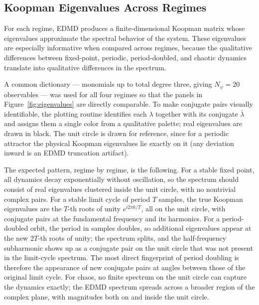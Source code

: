 \documentclass[11pt]{article}
\begin{document}
\subsection{Koopman Eigenvalues Across Regimes}
For each regime, EDMD produces a finite-dimensional Koopman matrix whose eigenvalues approximate the spectral behavior of the system. These eigenvalues are especially informative when compared across regimes, because the qualitative differences between fixed-point, periodic, period-doubled, and chaotic dynamics translate into qualitative differences in the spectrum.

A common dictionary --- monomials up to total degree three, giving $N_\psi = 20$ observables --- was used for all four regimes so that the panels in Figure~\ref{fig:eigenvalues} are directly comparable. To make conjugate pairs visually identifiable, the plotting routine identifies each $\lambda$ together with its conjugate $\bar{\lambda}$ and assigns them a single color from a qualitative palette; real eigenvalues are drawn in black. The unit circle is drawn for reference, since for a periodic attractor the physical Koopman eigenvalues lie exactly on it (any deviation inward is an EDMD truncation artifact).

The expected pattern, regime by regime, is the following. For a stable fixed point, all dynamics decay exponentially without oscillation, so the spectrum should consist of real eigenvalues clustered inside the unit circle, with no nontrivial complex pairs. For a stable limit cycle of period $T$ samples, the true Koopman eigenvalues are the $T$-th roots of unity $e^{i 2\pi k / T}$, all on the unit circle, with conjugate pairs at the fundamental frequency and its harmonics. For a period-doubled orbit, the period in samples doubles, so additional eigenvalues appear at the new $2T$-th roots of unity; the spectrum splits, and the half-frequency subharmonic shows up as a conjugate pair on the unit circle that was not present in the limit-cycle spectrum. The most direct fingerprint of period doubling is therefore the appearance of new conjugate pairs at angles between those of the original limit cycle. For chaos, no finite spectrum on the unit circle can capture the dynamics exactly; the EDMD spectrum spreads across a broader region of the complex plane, with magnitudes both on and inside the unit circle.
\end{document}
